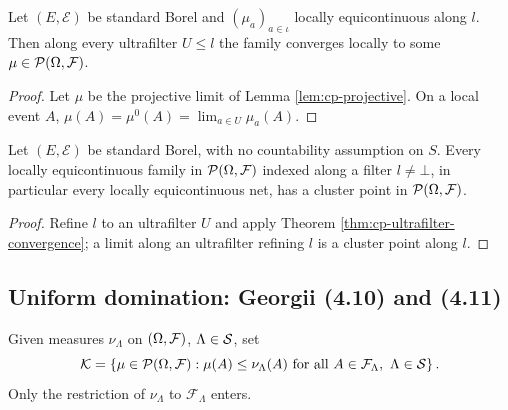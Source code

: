 \begin{theorem}
    \label{thm:cp-ultrafilter-convergence}
    \leanok

    Let $(E, \mathcal{E})$ be standard Borel and $(\mu_a)_{a \in \iota}$ locally equicontinuous
    along $l$. Then along every ultrafilter $U \leq l$ the family converges locally to some
    $\mu \in \mathcal{P}(\Omega, \mathcal{F})$.
\end{theorem}
\begin{proof}
    \leanok

    Let $\mu$ be the projective limit of Lemma \ref{lem:cp-projective}. On a local event $A$,
    $\mu(A) = \mu^0(A) = \lim_{a \in U}\mu_a(A)$.
\end{proof}

\begin{proposition}[Georgii (4.9)]
    \label{prop:cp-49}
    \leanok

    Let $(E, \mathcal{E})$ be standard Borel, with no countability assumption on $S$. Every
    locally equicontinuous family in $\mathcal{P}(\Omega, \mathcal{F})$ indexed along a filter
    $l \neq \bot$, in particular every locally equicontinuous net, has a cluster point in
    $\mathcal{P}(\Omega, \mathcal{F})$.
\end{proposition}
\begin{proof}
    \leanok

    Refine $l$ to an ultrafilter $U$ and apply Theorem \ref{thm:cp-ultrafilter-convergence};
    a limit along an ultrafilter refining $l$ is a cluster point along $l$.
\end{proof}

\subsection*{Uniform domination: Georgii (4.10) and (4.11)}

\begin{definition}
    \label{def:cp-dominated}
    \leanok

    Given measures $\nu_\Lambda$ on $(\Omega, \mathcal{F})$, $\Lambda \in \mathcal{S}$, set
    \[\mathcal{K} = \left\{ \mu \in \mathcal{P}(\Omega, \mathcal{F}) :
      \mu(A) \leq \nu_\Lambda(A) \text{ for all } A \in \mathcal{F}_\Lambda,\ \Lambda \in \mathcal{S} \right\}.\]
    Only the restriction of $\nu_\Lambda$ to $\mathcal{F}_\Lambda$ enters.
\end{definition}

